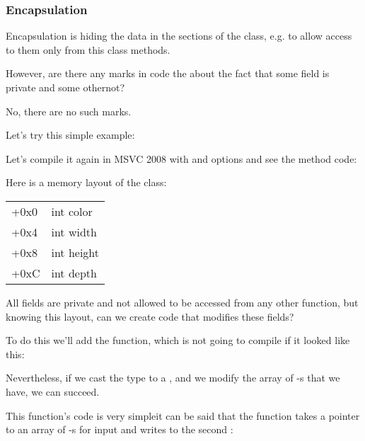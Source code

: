 \subsubsection{Encapsulation}

Encapsulation is hiding the data in the  sections of the class, 
e.g. to allow access to them only from this class methods.

However, are there any marks in code the about the fact that some field is private and
some other\EMDASH{}not?

No, there are no such marks.

Let's try this simple example:



Let's compile it again in MSVC 2008 with \Ox and \Obzero options and see the  method code:



Here is a memory layout of the class:

\begin{center}
\begin{tabular}{ | l | l | }
\hline
  \tableheader{} \\
\hline
  +0x0 & int color \\
\hline
  +0x4 & int width \\
\hline
  +0x8 & int height \\
\hline
  +0xC & int depth \\
\hline
\end{tabular}
\end{center}

All fields are private and not allowed to be accessed from any other
function, but knowing this layout, can we create code that modifies these fields? 

To do this we'll add the  function, 
which is not going to compile if it looked like this:



Nevertheless, if we cast the  type to a ,
and we modify the array of \Tint{}-s that we have, we can succeed.



This function's code is very simple\EMDASH{}it can be said that the function takes a pointer to an array of \Tint{}-s for input
and writes  to the second \Tint{}:

